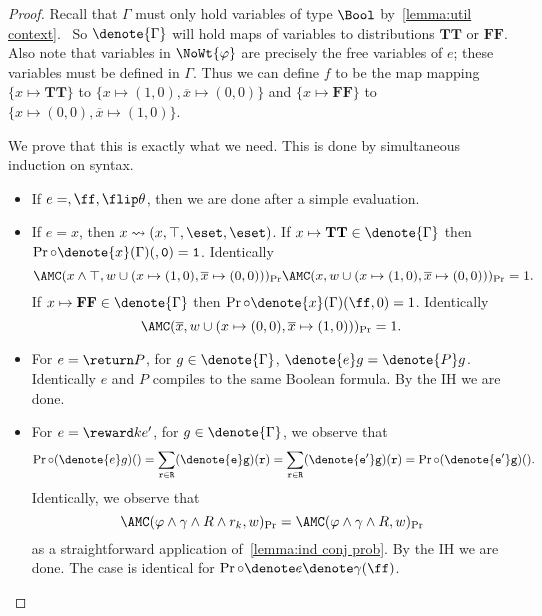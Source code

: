 \begin{proof}
  Recall that $\Gamma$ must only hold variables of 
  type $\Bool$ by~\cref{lemma:util context}. \
  So $\denote{\Gamma}$ will hold maps of variables to distributions $\mathbf{TT}$ or $\mathbf{FF}$. 
  Also note that 
  variables in $\NoWt{\varphi}$ are precisely the free variables of $e$; 
  these variables must be defined in $\Gamma$. 
  Thus we can define $f$ to be the map mapping $\{x \mapsto \mathbf{TT}\}$ to $\{x \mapsto (1,0), \overline x \mapsto (0,0)\}$ and $\{x \mapsto \mathbf{FF}\}$ to $\{x \mapsto (0,0), \overline x \mapsto (1,0)\}$.

  We prove that this is exactly what we need. This is done by simultaneous induction on syntax. 
  \begin{itemize}[leftmargin=*]
    \item If $e = \tt, \ff, \flip \theta$, then we are done after a simple evaluation.
    
    \item If $e = x$, then $x \leadsto (x, \top, \eset, \eset)$. 
    If $x \mapsto \mathbf{TT} \in \denote{\Gamma}$ then $\Pr \circ \denote{x} (\Gamma) (\tt,0) = 1$. Identically 
    \begin{equation}
      \AMC(x \land \top, w \cup (x \mapsto (1,0), \overline x \mapsto (0,0)))_{\Pr} 
      \AMC(x, w \cup (x \mapsto (1,0), \overline x \mapsto (0,0)))_{\Pr} 
      = 1.
    \end{equation}
    If $x \mapsto \mathbf{FF} \in \denote{\Gamma}$ then $\Pr \circ \denote{x} (\Gamma) (\ff,0) = 1$. Identically 
    \begin{equation}
      \AMC(\overline x, w \cup (x \mapsto (0,0), \overline x \mapsto (1,0)))_{\Pr} = 1.
    \end{equation}

    \item For $e = \return P$, for $g \in \denote{\Gamma}$,
    $\denote{e}g = \denote{P}g$. 
    Identically $e$ and $P$ compiles to the same Boolean formula. By the IH we are done.

    \item For $e = \reward k {e'}$, for $g \in \denote{\Gamma}$, we observe that
      $$\Pr \circ (\denote{e} g) (\tt) 
        = \sum_{r \in R} (\denote{e}g)(r)
        = \sum_{r \in R} (\denote{e'}g)(r) = \Pr \circ (\denote{e'} g)(\tt).$$
    Identically, we observe that
    $$
      \AMC(\varphi \land \gamma \land R \land r_k, w)_{\Pr}
      = \AMC(\varphi \land \gamma \land R, w)_{\Pr}
    $$
    as a straightforward application of~\cref{lemma:ind conj prob}. By the IH we are done. The case is identical for $\Pr \circ \denote e \denote \gamma  (\ff)$.



\end{itemize}
\end{proof}
